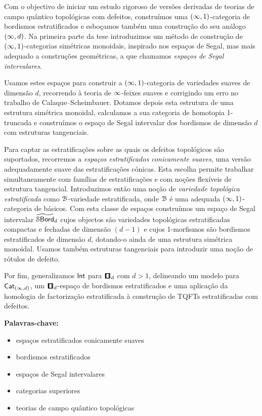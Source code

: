 Com o objectivo de iniciar um estudo rigoroso de versões derivadas de teorias de campo quântico topológicas com defeitos, construímos uma $(\operatorname{\infty},1)$-categoria de bordismos estratificados e esboçamos também uma construção do seu análogo $(\operatorname{\infty},d)$. Na primeira parte da tese introduzimos um método de construção de $(\operatorname{\infty},1)$-categorias simétricas monoidais, inspirado nos espaços de Segal, mas mais adequado a construções geométricas, a que chamamos \emph{espaços de Segal intervalares}.

Usamos estes espaços para construir a $(\operatorname{\infty},1)$-categoria de variedades suaves de dimensão $d$, recorrendo à teoria de $\operatorname{\infty}$-feixes suaves e corrigindo um erro no trabalho de Calaque--Scheimbauer. Dotamos depois esta estrutura de uma estrutura simétrica monoidal, calculamos a sua categoria de homotopia 1-truncada e construímos o espaço de Segal intervalar dos bordismos de dimensão $d$ com estruturas tangenciais.

Para captar as estratificações sobre as quais os defeitos topológicos são suportados, recorremos a \emph{espaços estratificados conicamente suaves}, uma versão adequadamente suave das estratificações cónicas. Esta escolha permite trabalhar simultaneamente com famílias de estratificações e com noções flexíveis de estrutura tangencial. Introduzimos então uma noção de \emph{variedade topológica estratificada} como $\mathcal B$-variedade estratificada, onde $\mathcal B$ é uma adequada $(\operatorname{\infty},1)$-categoria de básicos. Com esta classe de espaços construímos um espaço de Segal intervalar $\operatorname{\widetilde{\mathcal S\mathsf{Bord}}}_d$ cujos objectos são variedades topológicas estratificadas compactas e fechadas de dimensão $(d-1)$ e cujos 1-morfismos são bordismos estratificados de dimensão $d$, dotando-o ainda de uma estrutura simétrica monoidal. Usamos também estruturas tangenciais para introduzir uma noção de rótulos de defeito.

Por fim, generalizamos $\operatorname{\mathsf{Int}}$ para $\cube_d$ com $d>1$, delineando um modelo para $\operatorname{{\sf Cat}}_{(\operatorname{\infty},d)}$, um $\cube_d$-espaço de bordismos estratificados e uma aplicação da homologia de factorização estratificada à construção de TQFTs estratificadas com defeitos.
\bigskip

\begin{samepage}
\noindent\textbf{Palavras-chave:}
\begin{itemize}[nosep]
    \item espaços estratificados conicamente suaves
    \item bordismos estratificados
    \item espaços de Segal intervalares
    \item categorias superiores
    \item teorias de campo quântico topológicas
\end{itemize}
\end{samepage}
